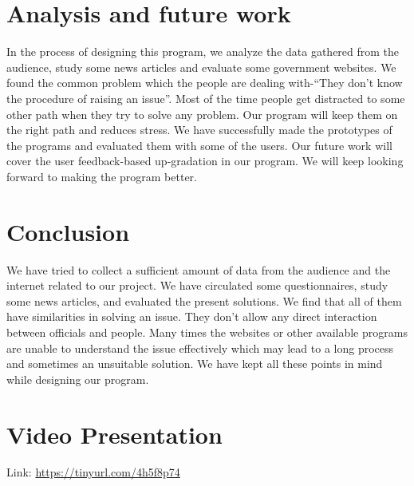 \documentclass[acmtog]{acmart}
\begin{document}
\section*{Analysis and future work}
In the process of designing this program, we analyze the data gathered from the audience, study some news articles and evaluate some government websites. We found the common problem which the people are dealing with-“They don’t know the procedure of raising an issue”.
Most of the time people get distracted to some other path when they try to solve any problem.
Our program will keep them on the right path and reduces stress. We have successfully made the prototypes of the programs and evaluated them with some of the users. Our future work will cover the user feedback-based up-gradation in our program. We will keep looking forward to making the program better.


\section*{Conclusion}
We have tried to collect a sufficient amount of data from the audience and the internet related to our project. We have circulated some questionnaires, study some news articles, and evaluated the present solutions. We find that all of them have similarities in solving an issue. They don’t allow any direct interaction between officials and people. Many times the websites or other available programs are unable to understand the issue effectively which may lead to a long process and sometimes an unsuitable solution. We have kept all these points in mind while designing our program.

\section*{Video Presentation}
Link: \url{https://tinyurl.com/4h5f8p74}

\clearpage
\end{document}
